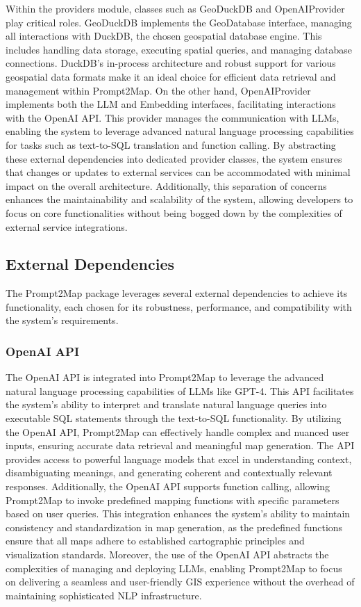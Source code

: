 Within the providers module, classes such as GeoDuckDB and OpenAIProvider play critical roles. GeoDuckDB implements the GeoDatabase interface, managing all interactions with DuckDB, the chosen geospatial database engine. This includes handling data storage, executing spatial queries, and managing database connections. DuckDB's in-process architecture and robust support for various geospatial data formats make it an ideal choice for efficient data retrieval and management within Prompt2Map. On the other hand, OpenAIProvider implements both the LLM and Embedding interfaces, facilitating interactions with the OpenAI API. This provider manages the communication with LLMs, enabling the system to leverage advanced natural language processing capabilities for tasks such as text-to-SQL translation and function calling. By abstracting these external dependencies into dedicated provider classes, the system ensures that changes or updates to external services can be accommodated with minimal impact on the overall architecture. Additionally, this separation of concerns enhances the maintainability and scalability of the system, allowing developers to focus on core functionalities without being bogged down by the complexities of external service integrations.

\subsection{External Dependencies}
The Prompt2Map package leverages several external dependencies to achieve its functionality, each chosen for its robustness, performance, and compatibility with the system's requirements.

\subsubsection{OpenAI API}
The OpenAI API is integrated into Prompt2Map to leverage the advanced natural language processing capabilities of LLMs like GPT-4. This API facilitates the system's ability to interpret and translate natural language queries into executable SQL statements through the text-to-SQL functionality. By utilizing the OpenAI API, Prompt2Map can effectively handle complex and nuanced user inputs, ensuring accurate data retrieval and meaningful map generation. The API provides access to powerful language models that excel in understanding context, disambiguating meanings, and generating coherent and contextually relevant responses. Additionally, the OpenAI API supports function calling, allowing Prompt2Map to invoke predefined mapping functions with specific parameters based on user queries. This integration enhances the system's ability to maintain consistency and standardization in map generation, as the predefined functions ensure that all maps adhere to established cartographic principles and visualization standards. Moreover, the use of the OpenAI API abstracts the complexities of managing and deploying LLMs, enabling Prompt2Map to focus on delivering a seamless and user-friendly GIS experience without the overhead of maintaining sophisticated NLP infrastructure.


